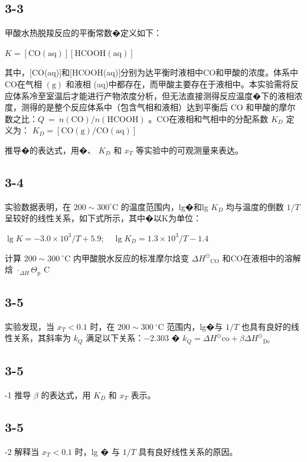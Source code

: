 \subsection*{3-3}
甲酸⽔热脱羧反应的平衡常数�定义如下：

$
K = [ \mathrm{CO} (\mathrm{aq}) ] [ \mathrm{HCOOH} (\mathrm{aq}) ]
$

其中，[CO(aq)]和[HCOOH(aq)]分别为达平衡时液相中CO和甲酸的浓度。体系中CO在⽓相 $( \mathrm { g } )$ 和液相 (aq)中都存在，⽽甲酸主要存在于液相中。本实验需将反应体系冷⾄室温后才能进⾏产物浓度分析，但⽆法直接测得反应温度�下的液相浓度，测得的是整个反应体系中（包含⽓相和液相）达到平衡后 CO 和甲酸的摩尔数之⽐：$Q \ = \ n ( \mathrm { C O } ) / n ( \mathrm { H C O O H } )$ 。CO在液相和⽓相中的分配系数 $K _ { D }$ 定义为： $K _ { D } = [ \mathrm { C O ( g ) / C O ( a q ) } ]$

推导�的表达式，⽤�、 $K _ { D }$ 和 $x _ { T }$ 等实验中的可观测量来表达。

\subsection*{3-4}
实验数据表明，在 $2 0 0 { \sim } 3 0 0 ^ { \circ } \mathrm { C }$ 的温度范围内，lg�和lg $K _ { D }$ 均与温度的倒数 $1 / T$ 呈较好的线性关系，如下式所⽰，其中�以K为单位：

$
\lg K = - 3. 0 \times 1 0 ^ {3} / T + 5. 9; \quad \lg K _ {D} = 1. 3 \times 1 0 ^ {3} / T - 1. 4
$

计算 $2 0 0 { \sim } 3 0 0 \ { } ^ { \circ } \mathrm { C }$ 内甲酸脱⽔反应的标准摩尔焓变 $\Delta H ^ { \ominus } \mathrm { _ { C O } }$ 和CO在液相中的溶解焓 $\cdot _ { \Delta H } \Theta _ { \mathrm { p } }$ C

\subsection*{3-5}
实验发现，当 $x _ { T } < 0 . 1$ 时，在 $2 0 0 { \sim } 3 0 0 \ { } ^ { \circ } \mathrm { C }$ 范围内，lg�与 $1 / T$ 也具有良好的线性关系，其斜率为 $k _ { Q }$ 满⾜以下关系：−2.303 � $k _ { Q } = \Delta H ^ { \ominus } \mathrm { c o } + \beta \Delta H ^ { \ominus } \mathrm { _ { D c } }$

\subsection*{3-5}
-1 推导 $\beta$ 的表达式，⽤ $K _ { D }$ 和 $x _ { T }$ 表⽰。

\subsection*{3-5}
-2 解释当 $x _ { T } < 0 . 1$ 时，lg � 与 $1 / T$ 具有良好线性关系的原因。

